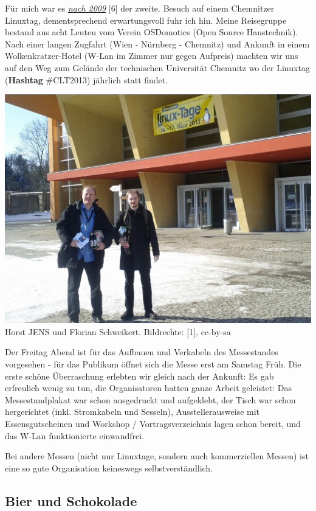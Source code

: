 Für mich war es \href{http://spielend-programmieren.at/de:sonstiges:alter_blog:2009:0318_chemnitzer_linux-tage_2009}{\textit{nach 2009}} [6] der zweite. Besuch auf einem Chemnitzer Linuxtag, dementsprechend erwartungsvoll fuhr ich hin. Meine Reisegruppe bestand aus acht Leuten vom Verein OSDomotics (Open Source Haustechnik). Nach einer langen Zugfahrt (Wien - Nürnberg - Chemnitz) und Ankunft in einem Wolkenkratzer-Hotel (W-Lan im Zimmer nur gegen Aufpreis) machten wir uns auf den Weg zum Gelände der technischen Universität Chemnitz wo der Linuxtag (\textbf{Hashtag} \#CLT2013) jährlich statt findet.
\begin{center}
\includegraphics[width=\linewidth]{chemnitz_eroeffnung.jpg}
\footnotesize{Horst JENS und Florian Schweikert. Bildrechte: [1], cc-by-sa}
\end{center}
Der Freitag Abend ist für das Aufbauen und Verkabeln des Messestandes vorgesehen - für das Publikum öffnet sich die Messe erst am Samstag Früh. Die erste schöne Überraschung erlebten wir gleich nach der Ankunft: Es gab erfreulich wenig zu tun, die Organisatoren hatten ganze Arbeit geleistet: Das Messestandplakat war schon ausgedruckt und aufgeklebt, der Tisch war schon hergerichtet (inkl. Stromkabeln und Sesseln), Ausstellerausweise mit Essensgutscheinen und Workshop / Vortragsverzeichnis lagen schon bereit, und das W-Lan funktionierte einwandfrei. 

Bei andere Messen (nicht nur Linuxtage, sondern auch kommerziellen Messen) ist eine so gute Organisation keineswegs selbstverständlich.


\subsection*{Bier und Schokolade}

